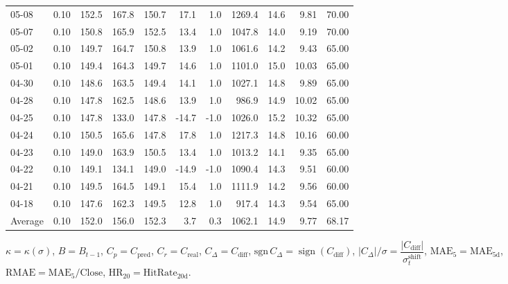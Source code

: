 \begin{threeparttable}
{\begin{tabular}{lrrrrrrrrrr}
05-08 & 0.10 & 152.5 & 167.8 & 150.7 & 17.1 & 1.0 & 1269.4 & 14.6 & 9.81 & 70.00 \\
05-07 & 0.10 & 150.8 & 165.9 & 152.5 & 13.4 & 1.0 & 1047.8 & 14.0 & 9.19 & 70.00 \\
05-02 & 0.10 & 149.7 & 164.7 & 150.8 & 13.9 & 1.0 & 1061.6 & 14.2 & 9.43 & 65.00 \\
05-01 & 0.10 & 149.4 & 164.3 & 149.7 & 14.6 & 1.0 & 1101.0 & 15.0 & 10.03 & 65.00 \\
04-30 & 0.10 & 148.6 & 163.5 & 149.4 & 14.1 & 1.0 & 1027.1 & 14.8 & 9.89 & 65.00 \\
04-28 & 0.10 & 147.8 & 162.5 & 148.6 & 13.9 & 1.0 & 986.9 & 14.9 & 10.02 & 65.00 \\
04-25 & 0.10 & 147.8 & 133.0 & 147.8 & -14.7 & -1.0 & 1026.0 & 15.2 & 10.32 & 65.00 \\
04-24 & 0.10 & 150.5 & 165.6 & 147.8 & 17.8 & 1.0 & 1217.3 & 14.8 & 10.16 & 60.00 \\
04-23 & 0.10 & 149.0 & 163.9 & 150.5 & 13.4 & 1.0 & 1013.2 & 14.1 & 9.35 & 65.00 \\
04-22 & 0.10 & 149.1 & 134.1 & 149.0 & -14.9 & -1.0 & 1090.4 & 14.3 & 9.51 & 60.00 \\
04-21 & 0.10 & 149.5 & 164.5 & 149.1 & 15.4 & 1.0 & 1111.9 & 14.2 & 9.56 & 60.00 \\
04-18 & 0.10 & 147.6 & 162.3 & 149.5 & 12.8 & 1.0 & 917.4 & 14.3 & 9.54 & 65.00 \\
Average & 0.10 & 152.0 & 156.0 & 152.3 & 3.7 & 0.3 & 1062.1 & 14.9 & 9.77 & 68.17 \\
\bottomrule
\end{tabular}
}%
\begin{tablenotes}\footnotesize
\item $\kappa=\kappa(\sigma)$, $B=B_{t-1}$, $C_p=C_{\text{pred}}$, $C_r=C_{\text{real}}$, $C_\Delta=C_{\text{diff}}$, $\mathrm{sgn}\,C_\Delta=\operatorname{sign}(C_{\text{diff}})$, $|C_\Delta|/\sigma=\dfrac{|C_{\text{diff}}|}{\sigma_t^{\text{shift}}}$, $\mathrm{MAE}_5=\mathrm{MAE}_{5\text{d}}$, $\mathrm{RMAE}= \mathrm{MAE}_5 / \text{Close}$, $\mathrm{HR}_{20}=\mathrm{HitRate}_{20\text{d}}$.
\end{tablenotes}
\end{threeparttable}
\endgroup